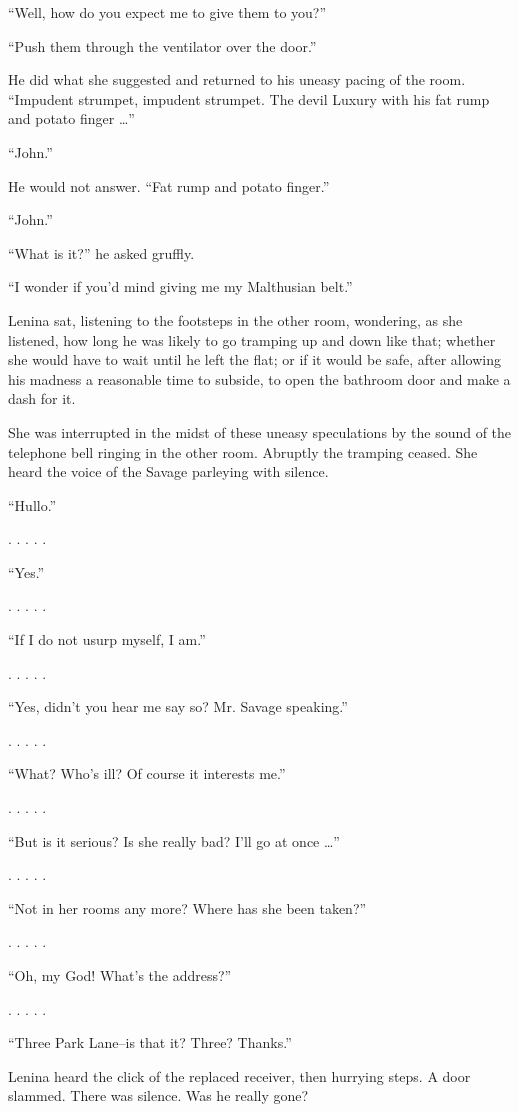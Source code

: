 \documentclass[12pt]{report}
\begin{document}
``Well, how do you expect me to give them to you?''

``Push them through the ventilator over the door.''

He did what she suggested and returned to his uneasy pacing of the room.
``Impudent strumpet, impudent strumpet. The devil Luxury with his fat
rump and potato finger \ldots{}''

``John.''

He would not answer. ``Fat rump and potato finger.''

``John.''

``What is it?'' he asked gruffly.

``I wonder if you'd mind giving me my Malthusian belt.''

Lenina sat, listening to the footsteps in the other room, wondering, as
she listened, how long he was likely to go tramping up and down like
that; whether she would have to wait until he left the flat; or if it
would be safe, after allowing his madness a reasonable time to subside,
to open the bathroom door and make a dash for it.

She was interrupted in the midst of these uneasy speculations by the
sound of the telephone bell ringing in the other room. Abruptly the
tramping ceased. She heard the voice of the Savage parleying with
silence.

``Hullo.''

. . . . .

``Yes.''

. . . . .

``If I do not usurp myself, I am.''

. . . . .

``Yes, didn't you hear me say so? Mr. Savage speaking.''

. . . . .

``What? Who's ill? Of course it interests me.''

. . . . .

``But is it serious? Is she really bad? I'll go at once \ldots{}''

. . . . .

``Not in her rooms any more? Where has she been taken?''

. . . . .

``Oh, my God! What's the address?''

. . . . .

``Three Park Lane--is that it? Three? Thanks.''

Lenina heard the click of the replaced receiver, then hurrying steps. A
door slammed. There was silence. Was he really gone?
\end{document}
